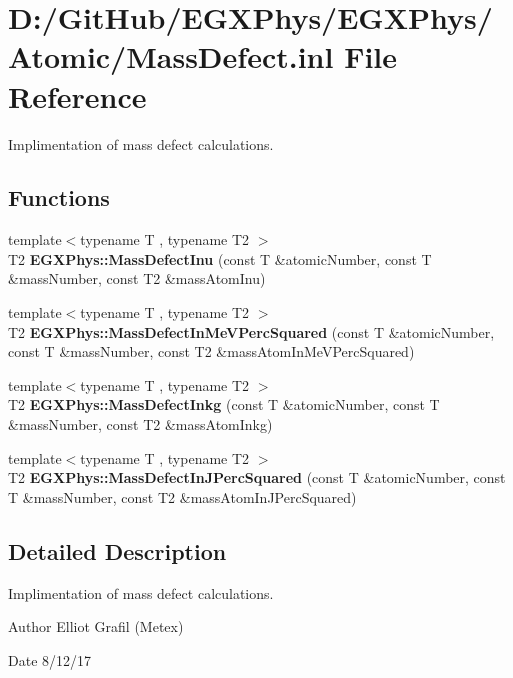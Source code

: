 \hypertarget{_mass_defect_8inl}{}\section{D\+:/\+Git\+Hub/\+E\+G\+X\+Phys/\+E\+G\+X\+Phys/\+Atomic/\+Mass\+Defect.inl File Reference}
\label{_mass_defect_8inl}


Implimentation of mass defect calculations.  


\subsection*{Functions}
\begin{DoxyCompactItemize}
\item 
{\footnotesize template$<$typename T , typename T2 $>$ }\\T2 {\bfseries E\+G\+X\+Phys\+::\+Mass\+Defect\+Inu} (const T \&atomic\+Number, const T \&mass\+Number, const T2 \&mass\+Atom\+Inu)
\item 
{\footnotesize template$<$typename T , typename T2 $>$ }\\T2 {\bfseries E\+G\+X\+Phys\+::\+Mass\+Defect\+In\+Me\+V\+Perc\+Squared} (const T \&atomic\+Number, const T \&mass\+Number, const T2 \&mass\+Atom\+In\+Me\+V\+Perc\+Squared)
\item 
{\footnotesize template$<$typename T , typename T2 $>$ }\\T2 {\bfseries E\+G\+X\+Phys\+::\+Mass\+Defect\+Inkg} (const T \&atomic\+Number, const T \&mass\+Number, const T2 \&mass\+Atom\+Inkg)
\item 
{\footnotesize template$<$typename T , typename T2 $>$ }\\T2 {\bfseries E\+G\+X\+Phys\+::\+Mass\+Defect\+In\+J\+Perc\+Squared} (const T \&atomic\+Number, const T \&mass\+Number, const T2 \&mass\+Atom\+In\+J\+Perc\+Squared)
\end{DoxyCompactItemize}


\subsection{Detailed Description}
Implimentation of mass defect calculations. 

\begin{DoxyAuthor}{Author}
Elliot Grafil (Metex) 
\end{DoxyAuthor}
\begin{DoxyDate}{Date}
8/12/17 
\end{DoxyDate}
